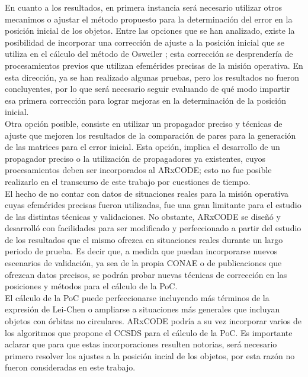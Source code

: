En cuanto a los resultados, en primera instancia ser\'a necesario utilizar otros mecanimos o ajustar el m\'etodo propuesto para la determinaci\'on del error en la posici\'on inicial de los objetos. Entre las opciones que se han analizado, existe la posibilidad de incorporar una correcci\'on de ajuste a la posici\'on inicial que se utiliza en el c\'alculo del m\'etodo de Osweiler \citep{osweiler}; esta correcci\'on se desprender\'ia de procesamientos previos que utilizan efem\'erides precisas de la misi\'on operativa. En esta direcci\'on, ya se han realizado algunas pruebas, pero los resultados no fueron concluyentes, por lo que ser\'a necesario seguir evaluando de qu\'e modo impartir esa primera correcci\'on para lograr mejoras en la determinaci\'on de la posici\'on inicial.\\

Otra opci\'on posible, consiste en utilizar un propagador preciso y t\'ecnicas de ajuste que mejoren los resultados de la comparaci\'on de pares para la generaci\'on de las matrices para el error inicial. Esta opci\'on, implica el desarrollo de un propagador preciso o la utilizaci\'on de propagadores ya existentes, cuyos procesamientos deben ser incorporados al ARxCODE; esto no fue posible realizarlo en el transcurso de este trabajo por cuestiones de tiempo.\\

El hecho de no contar con datos de situaciones reales para la misi\'on operativa cuyas efem\'erides precisas fueron utilizadas, fue una gran limitante para  el estudio de las distintas t\'ecnicas y validaciones. No obstante, ARxCODE se dise\~n\'o y desarroll\'o con facilidades para ser modificado y perfeccionado a partir del estudio de los resultados que el mismo ofrezca en situaciones reales durante un largo periodo de prueba. Es decir que, a medida que puedan incorporarse nuevos escenarios de validaci\'on, ya sea de la propia CONAE o de publicaciones que ofrezcan datos precisos, se podr\'an probar nuevas t\'ecnicas de correcci\'on en las posiciones y m\'etodos para el c\'alculo de la PoC.\\

El c\'alculo de la PoC puede perfeccionarse incluyendo m\'as t\'erminos de la expresi\'on de Lei-Chen \citep{leichen} o ampliarse a situaciones m\'as generales que incluyan objetos con \'orbitas no circulares. ARxCODE podr\'ia a su vez incorporar varios de los algoritmos que propone el CCSDS para el c\'alculo de la PoC. Es importante aclarar que para que estas incorporaciones resulten notorias, ser\'a necesario primero resolver los ajustes a la posici\'on incial de los objetos, por esta raz\'on no fueron consideradas en este trabajo.\\


\endinput